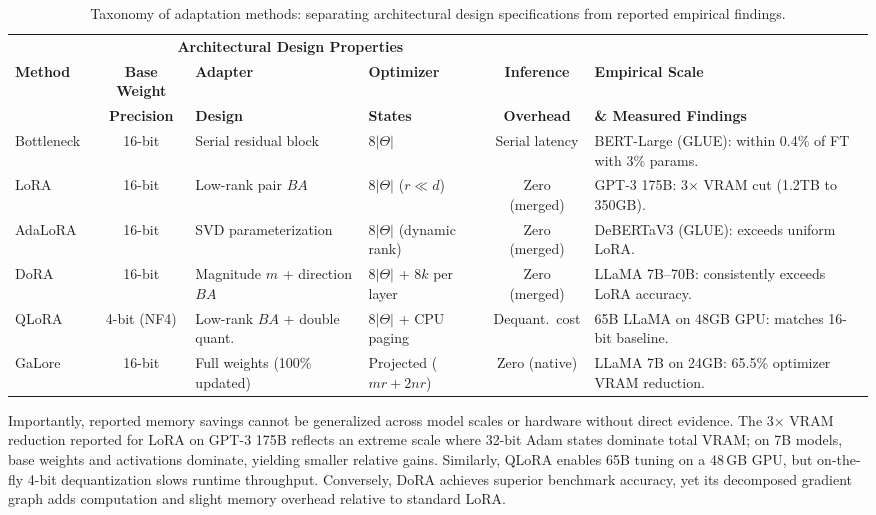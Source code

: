 \documentclass[11pt,a4paper]{article}
\begin{document}
\begin{table}[htbp]
\centering
\scriptsize
\setlength{\tabcolsep}{3pt}
\caption{Taxonomy of adaptation methods: separating architectural design specifications from reported empirical findings.}
\label{tab:comparison}
\noindent\begin{tabularx}{\linewidth}{@{}l c >{\raggedright\arraybackslash}p{2.1cm} >{\raggedright\arraybackslash}p{2.1cm} c >{\raggedright\arraybackslash}X@{}}
\toprule
 & \multicolumn{3}{c}{\textbf{Architectural Design Properties}} & \multicolumn{2}{c}{\textbf{Reported Measured Results}} \\
\cmidrule(lr){2-4} \cmidrule(lr){5-6}
\textbf{Method} & \textbf{Base Weight} & \textbf{Adapter} & \textbf{Optimizer} & \textbf{Inference} & \textbf{Empirical Scale} \\
 & \textbf{Precision} & \textbf{Design} & \textbf{States} & \textbf{Overhead} & \textbf{\& Measured Findings} \\
\midrule
Bottleneck~\cite{houlsby2019parameter} & 16-bit & Serial residual block & $8\lvert\Theta\rvert$ & Serial latency & BERT-Large (GLUE): within 0.4\% of FT with 3\% params. \\
LoRA~\cite{hu2021lora} & 16-bit & Low-rank pair $BA$ & $8\lvert\Theta\rvert$ ($r \ll d$) & Zero (merged) & GPT-3 175B: 3$\times$ VRAM cut (1.2TB to 350GB). \\
AdaLoRA~\cite{zhang2023adalora} & 16-bit & SVD parameterization & $8\lvert\Theta\rvert$ (dynamic rank) & Zero (merged) & DeBERTaV3 (GLUE): exceeds uniform LoRA. \\
DoRA~\cite{liu2024dora} & 16-bit & Magnitude $m$ + direction $BA$ & $8\lvert\Theta\rvert$ + $8k$ per layer & Zero (merged) & LLaMA 7B--70B: consistently exceeds LoRA accuracy. \\
QLoRA~\cite{dettmers2023qlora} & 4-bit (NF4) & Low-rank $BA$ + double quant. & $8\lvert\Theta\rvert$ + CPU paging & Dequant.~cost & 65B LLaMA on 48GB GPU: matches 16-bit baseline. \\
GaLore~\cite{zhao2024galore} & 16-bit & Full weights (100\% updated) & Projected ($mr+2nr$) & Zero (native) & LLaMA 7B on 24GB: 65.5\% optimizer VRAM reduction. \\
\bottomrule
\end{tabularx}
\end{table}

Importantly, reported memory savings cannot be generalized across model scales or hardware without direct evidence. The 3$\times$ VRAM reduction reported for LoRA on GPT-3 175B reflects an extreme scale where 32-bit Adam states dominate total VRAM; on 7B models, base weights and activations dominate, yielding smaller relative gains. Similarly, QLoRA enables 65B tuning on a 48\,GB GPU, but on-the-fly 4-bit dequantization slows runtime throughput. Conversely, DoRA achieves superior benchmark accuracy, yet its decomposed gradient graph adds computation and slight memory overhead relative to standard LoRA.
\end{document}
